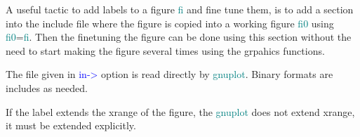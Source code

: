 \begin{note} 
A useful tactic to add labels to a figure \textcolor{teal}{fi} and fine tune them, is to 
add	a section into the include file where the figure is copied into a working figure \textcolor{teal}{fi0} 
using \textcolor{teal}{fi0}=\textcolor{teal}{fi}. Then the finetuning the figure can be done using this section 
without the need to start making the figure several times using the grpahics functions. 
\end{note} 
\begin{note} 
The file given in \textcolor{blue}{in->} option is read directly by \textcolor{teal}{gnuplot}. Binary formats are includes as needed. 
\end{note} 
\begin{note} 
If the label extends the xrange of the figure, the \textcolor{teal}{gnuplot} does not extend xrange, 
it must be extended explicitly. 
\end{note} 
\singlespacing 
